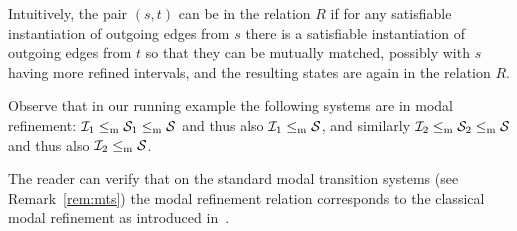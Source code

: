 Intuitively, the pair $(s,t)$ can be in the relation $R$ if for any
satisfiable instantiation of outgoing edges from $s$ there is
a satisfiable instantiation of outgoing edges from $t$ so that they
can be mutually matched, possibly with $s$ having more refined
intervals, and the resulting states are again in the relation $R$.

Observe that in our running example 
the following systems are in modal 
refinement: $\mathcal I_1\le_\mathrm m \mathcal S_1 \le_\mathrm m \mathcal S$ and thus also
$\mathcal I_1 \le_\mathrm m \mathcal S$, and similarly $\mathcal I_2\le_\mathrm m \mathcal S_2 \le_\mathrm m \mathcal S$ and thus also  $\mathcal I_2 \le_\mathrm m \mathcal S$.

The reader can verify that on the standard modal transition systems (see 
Remark~\ref{rem:mts}) the modal refinement relation corresponds
to the classical modal refinement as 
introduced in~\cite{DBLP:conf/lics/LarsenT88}.  

